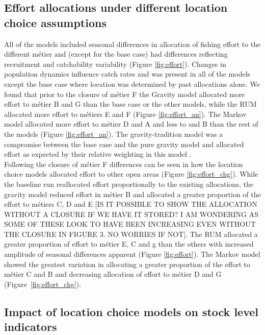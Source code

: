 \documentclass[12pt, halfline, a4paper]{ouparticle}
\begin{document}
\subsection{Effort allocations under different location choice assumptions}

All of the models included seasonal differences in allocation of fishing effort
to the different métier and (except for the base case) had differences
reflecting recruitment and catchability variability
(Figure \ref{fig:effort}). Changes in population dynamics influence catch rates and was present in all of the models except
the base case where location was determined by past allocations alone. We found
that prior to the closure of métier F the Gravity model allocated more effort
to métier B and G than the base case or the other models, while the RUM
allocated more effort to métiers E and F (Figure \ref{fig:effort_an}). The
Markov model allocated more effort to métier D and A and less to and B than the
rest of the models (Figure \ref{fig:effort_an}). The gravity-tradition model
was a compromise between the base case and the pure gravity model and allocated effort as
expected by their relative weighting in this model  . \\

Following the closure of métier F differences can be seen in how the location
choice models allocated effort to other open areas (Figure
\ref{fig:effort_chg}). While the baseline run reallocated effort proportionally
to the existing allocations, the gravity model reduced effort in métier B
and allocated a greater proportion of the effort to métiers C, D and E [IS IT POSSIBLE TO SHOW THE ALLOCATION WITHOUT A CLOSURE IF WE HAVE IT STORED? I AM WONDERING AS SOME OF THESE LOOK TO HAVE BEEN INCREASING EVEN WITHOUT THE CLOSURE IN FIGURE 3. NO WORRIES IF NOT]. The RUM
allocated a greater proportion of effort to métier E, C and g than the others with increased amplitude of seasonal differences apparent (Figure \ref{fig:effort}). The Markov model showed the greatest variation in allocating a greater
proportion of the effort to métier C and B and decreasing allocation of effort to
métier D and G (Figure~\ref{fig:effort_chg}).

\subsection{Impact of location choice models on stock level indicators}
\end{document}
